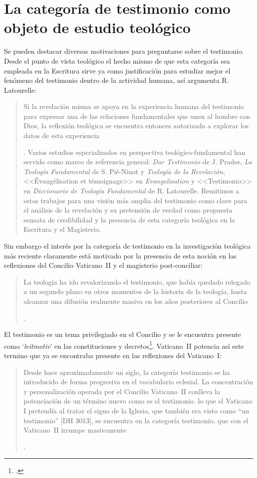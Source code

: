\section{La categoría de testimonio como objeto de estudio teológico}

Se pueden destacar diversas motivaciones para preguntarse sobre el testimonio. Desde el punto de vista teológico el hecho mismo de que esta categoría sea empleada en la Escritura sirve ya como justificación para estudiar mejor el fenómeno del testimonio dentro de la actividad humana, así argumenta R. Latourelle: \blockquote[{\Cite[1523]{latourelle2000testimonio}}. Varios estudios especializados en perspectiva teológico-fundamental han servido como marco de referencia general: \emph{Dar Testimonio} de J. Prades, \emph{La Teología Fundamental} de S. Pié-Ninot y \emph{Teología de la Revelación}, <<Évangélisation et témoignage>> en \emph{Evangelisation} y <<Testimonio>> en \emph{Diccionario de Teología Fundamental} de R. Latourelle. Remitimos a estos trabajos para una visión más amplia del testimonio como clave para el análisis de la revelación y su pretensión de verdad como propuesta sensata de credibilidad y la presencia de esta categoría teológica en la Escritura y el Magisterio.]{Si la revelación misma se apoya en la experiencia humana del testimonio para expresar una de las relaciones fundamentales que unen al hombre con Dios, la reflexión teológica se encuentra entonces autorizada a explorar los datos de esta experiencia}. Sin embargo el interés por la categoría de testimonio en la investigación teológica más reciente claramente está motivado por la presencia de esta noción en las reflexiones del Concilio Vaticano~II y el magisterio post-conciliar: \blockquote[{\Cite[81]{prades2015testimonio}}.]{La teología ha ido revalorizando el testimonio, que había quedado relegado a un segundo plano en otros momentos de la historia de la teología, hasta alcanzar una difusión realmente masiva en los años posteriores al Concilio}. El testimonio es un tema privilegiado en el Concilio y se le encuentra presente como `\emph{leitmotiv}' en las constituciones y decretos\footcite[Cf.][1523]{latourelle2000testimonio}. Vaticano~II potencia así este termino que ya se encontraba presente en las reflexiones del Vaticano~I: \blockquote[{\Cite[572]{ninot2009tf}}.]{Desde hace aproximadamente un siglo, la categoría testimonio se ha introducido de forma progresiva en el vocabulario eclesial. La concentración y personalización operada por el Concilio Vaticano~II conlleva la potenciación de un término nuevo como es el testimonio. \textelp{} lo que el Vaticano I pretendía al tratar el signo de la Iglesia, que también era visto como ``un testimonio'' [DH 3013], se encuentra en la categoría testimonio, que con el Vaticano~II irrumpe masivamente}.


